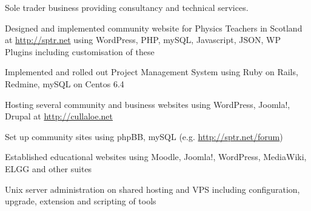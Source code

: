 \documentclass[10pt]{article}
\newenvironment{outerlist}[1][\enskip\textbullet]%
        {\begin{itemize}[#1]}{\end{itemize}%
         \vspace{-.6\baselineskip}}
\newenvironment{innerlist}[1][\enskip\textbullet]%
        {\begin{compactitem}[#1]}{\end{compactitem}}
\begin{document}
\begin{outerlist}
\item[]Sole trader business providing consultancy and technical services.

\begin{innerlist}
	\item Designed and implemented community website for Physics Teachers in Scotland at \url{http://sptr.net} using WordPress, PHP, mySQL, Javascript, JSON, WP Plugins including customisation of these
	\item Implemented and rolled out Project Management System using Ruby on Rails, Redmine, mySQL on Centos 6.4
	\item Hosting several community and business websites using WordPress, Joomla!, Drupal at \url{http://cullaloe.net}
	\item Set up community sites using phpBB, mySQL (e.g. \url{http://sptr.net/forum})
	\item Established educational websites using Moodle, Joomla!, WordPress, MediaWiki, ELGG and other suites
	\item Unix server administration on shared hosting and VPS including configuration, upgrade, extension and scripting of tools
\end{innerlist}
\end{outerlist}
%
%
\end{document}
